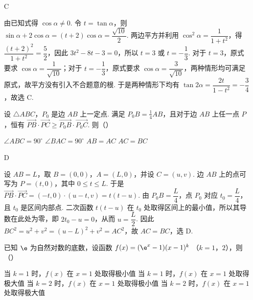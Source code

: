 \begin{answer}
C
\end{answer}

\begin{solution}
由已知式得 \(\cos\alpha\ne0\). 令 \(t=\tan\alpha\)，则
\(\sin\alpha+2\cos\alpha=(t+2)\cos\alpha=\dfrac{\sqrt{10}}{2}\). 两边平方并利用 \(\cos^{2}\alpha=\dfrac{1}{1+t^{2}}\)，得 \(\dfrac{(t+2)^{2}}{1+t^{2}}=\dfrac{5}{2}\)，因此 \(3t^{2}-8t-3=0\)，所以 \(t=3\) 或 \(t=-\dfrac{1}{3}\). 对于 \(t=3\)，原式要求 \(\cos\alpha=\dfrac{1}{\sqrt{10}}\)；对于 \(t=-\dfrac{1}{3}\)，原式要求 \(\cos\alpha=\dfrac{3}{\sqrt{10}}\)，两种情形均可满足原式，故平方没有引入不合题意的根. 于是两种情形下均有 \(\tan2\alpha=\dfrac{2t}{1-t^{2}}=-\dfrac{3}{4}\)，故选 C.
\end{solution}

\begin{problem}
设 \(\triangle ABC\)，\(P_0\) 是边 \(AB\) 上一定点. 满足 \(P_0B = \frac{1}{4}AB\)，且对于边 \(AB\) 上任一点 \(P\)，恒有 \(\overrightarrow{PB} \cdot \overrightarrow{PC} \geqslant \overrightarrow{P_0B} \cdot \overrightarrow{P_0C}\). 则（\quad）

\choices
    {\(\angle ABC = 90^{\circ}\)}
    {\(\angle BAC = 90^{\circ}\)}
    {\(AB = AC\)}
    {\(AC = BC\)}
\end{problem}

\begin{answer}
D
\end{answer}

\begin{solution}
设 \(AB=L\)，取 \(B=(0,0)\)，\(A=(L,0)\)，并设 \(C=(u,v)\). 边 \(AB\) 上的点可写为 \(P=(t,0)\)，其中 \(0\leqslant t\leqslant L\). 于是
\(\overrightarrow{PB}\cdot\overrightarrow{PC}=(-t,0)\cdot(u-t,v)=t(t-u)\). 由 \(P_{0}B=\dfrac{L}{4}\)，点 \(P_{0}\) 对应 \(t_{0}=\dfrac{L}{4}\)，且 \(t_{0}\) 是区间内部点. 二次函数 \(t(t-u)\) 在 \(t_{0}\) 处取得区间上的最小值，所以其导数在此处为零，即 \(2t_{0}-u=0\)，从而 \(u=\dfrac{L}{2}\). 因此 \(BC^{2}=u^{2}+v^{2}=(u-L)^{2}+v^{2}=AC^{2}\)，故 \(AC=BC\)，选 D.
\end{solution}

\begin{problem}
已知 \(\e\) 为自然对数的底数，设函数 \( f(x) = (\e^{x} - 1)(x - 1)^{k}  \) （\(k = 1\)，\(2\)），则（\quad）

\choices
    {当 \(k = 1\) 时，\(f(x)\) 在 \(x = 1\) 处取得极小值}
    {当 \(k = 1\) 时，\(f(x)\) 在 \(x = 1\) 处取得极大值}
    {当 \(k = 2\) 时，\(f(x)\) 在 \(x = 1\) 处取得极小值}
    {当 \(k = 2\) 时，\(f(x)\) 在 \(x = 1\) 处取得极大值}
\end{problem}

